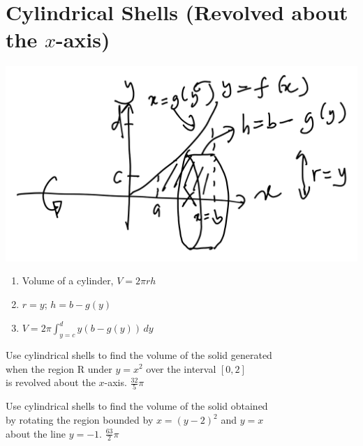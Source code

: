 
\makenewpage
\section{Cylindrical Shells (Revolved about the $x$-axis)}

\begin{myframe}[arc=10pt,auto outer arc]
\centering
\includegraphics[width=0.7\linewidth]{chapter5/shellx}

\begin{enumerate}
	\item Volume of a cylinder, $V = 2\pi rh$
	\item $r = y$; $h = b - g(y)$
	\item  $\displaystyle V = 2\pi\int_{y=c}^d y \left(b - g(y)\right) \, dy$
\end{enumerate}

\end{myframe}

\problemans%
{Use cylindrical shells to find the volume of the solid generated \\
	when the region R under $y=x^2$ over the interval $[0, 2]$ \\ 
	is revolved about the $x$-axis.
}%
{$\displaystyle \frac{32}{5} \pi$}%


\newpage

\problemans%
{Use cylindrical shells to find the volume of the solid obtained \\
	by  rotating the region bounded by $x=\left(y-2\right)^2$ and $y=x$ \\ 
	about the  line $y=-1$.
}%
{$\displaystyle \frac{63}{2} \pi$}%


